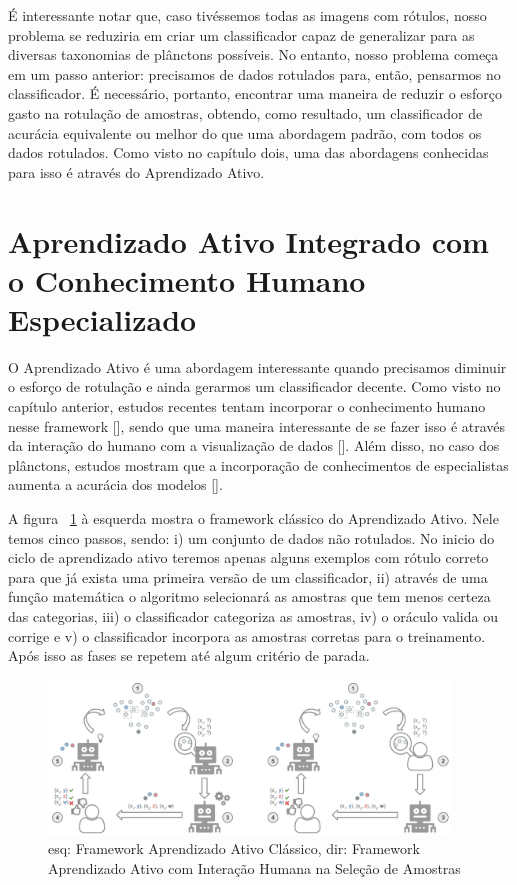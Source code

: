 É interessante notar que, caso tivéssemos todas as imagens com rótulos, nosso problema se reduziria em criar um classificador capaz de generalizar para as diversas taxonomias de plânctons possíveis. No entanto, nosso problema começa em um passo anterior: precisamos de dados rotulados para, então, pensarmos no classificador. É necessário, portanto, encontrar uma maneira de reduzir o esforço gasto na rotulação de amostras, obtendo, como resultado, um classificador de acurácia equivalente ou melhor do que uma abordagem padrão, com todos os dados rotulados. Como visto no capítulo dois, uma das abordagens conhecidas para isso é através do Aprendizado Ativo. 


\section{Aprendizado Ativo Integrado com o Conhecimento Humano Especializado}
\label{sec:aprendizado_ativo_conhecimento_humano}

O Aprendizado Ativo é uma abordagem interessante quando precisamos diminuir o esforço de rotulação e ainda gerarmos um classificador decente. Como visto no capítulo anterior, estudos recentes tentam incorporar o conhecimento humano nesse framework [\cite{castro2009human, kottke2018other}], sendo que uma maneira interessante de se fazer isso é através da interação do humano com a visualização de dados [\cite{yang2018visually, bernard2018comparing, weigl2016mapview}]. Além disso, no caso dos plânctons, estudos mostram que a incorporação de conhecimentos de especialistas aumenta a acurácia dos modelos [\cite{benfield2007rapid}].

A figura ~\ref{fig:frameworks_AL} à esquerda mostra o framework clássico do Aprendizado Ativo. Nele temos cinco passos, sendo: i) um conjunto de dados não rotulados. No inicio do ciclo de aprendizado ativo teremos apenas alguns exemplos com rótulo correto para que já exista uma primeira versão de um classificador, ii) através de uma função matemática o algoritmo selecionará as amostras que tem menos certeza das categorias, iii) o classificador categoriza as amostras, iv) o oráculo valida ou corrige e v) o classificador incorpora as amostras corretas para o treinamento. Após isso as fases se repetem até algum critério de parada.

\begin{figure}
  \centering
  \includegraphics[width=0.95\textwidth]{figures/Frameworks_Active_Learning.png}
  \caption{esq: Framework Aprendizado Ativo Clássico, dir: Framework Aprendizado Ativo com Interação Humana na Seleção de Amostras}
  \label{fig:frameworks_AL}
\end{figure}


